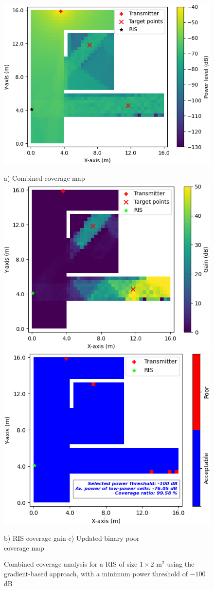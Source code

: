 \documentclass{IEEEoj}
\begin{document}
\begin{figure}
	\centering
	\includegraphics[width=0.7\linewidth]{Sim_Results/Comb_cov_1x2_Gradient.png}
	
	a) Combined coverage map \\[5pt]
	
	\includegraphics[width=0.49\linewidth]{Sim_Results/RIS_cov_gain_1x2_Gradient.png}
	\hfill
	\includegraphics[width=0.48\linewidth]{Sim_Results/New_Binary_Cov_Map_1x2_Gradient.png}
	
	\hspace{10pt} b) RIS coverage gain \hspace{30pt} c) Updated binary poor \\ \hspace{140pt} coverage map
	\caption{Combined coverage analysis for a RIS of size $1 \times 2$ m$^2$ using the gradient-based approach, with a minimum power threshold of $-100$ dB}
	\label{comb_cov_gradient}
\end{figure}
\end{document}
